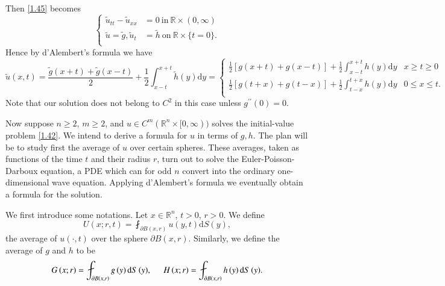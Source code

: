Then \eqref{1.45} becomes 
$$
\left\{ \begin{aligned}
	\widetilde{u}_{tt}-\widetilde{u}_{xx}&=0\ \text{in}\ \mathbb{R}\times(0,\infty)\\
	\widetilde{u}=\widetilde{g},\widetilde{u}_t&=\widetilde{h}\ \text{on}\ \mathbb{R}\times\{t=0\}.\\
\end{aligned} \right. 
$$
Hence by d'Alembert's formula we have 
\begin{equation}\label{1.97}
\widetilde{u}\left( x,t \right) =\frac{\widetilde{g}\left( x+t \right) +\widetilde{g}\left( x-t \right)}{2}+\frac{1}{2}\int_{x-t}^{x+t}{\widetilde{h}\left( y \right) \mathrm{d}y}=\left\{ \begin{aligned}
	\frac{1}{2}\left[ g\left( x+t \right) +g\left( x-t \right) \right] +\frac{1}{2}\int_{x-t}^{x+t}{h\left( y \right) \mathrm{d}y}&x\ge t\ge 0\\
	\frac{1}{2}\left[ g\left( t+x \right) +g\left( t-x \right) \right] +\frac{1}{2}\int_{t-x}^{t+x}{h\left( y \right) \mathrm{d}y}&0\le x\le t.\\
\end{aligned} \right. 
\end{equation}
Note that our solution does not belong to $C^2$ in this case unless $g^{\prime\prime}(0)=0$.\par
Now suppose $n\ge 2$, $m\ge 2$, and $u\in C^m(\mathbb{R}^n\times[0,\infty))$ solves the initial-value problem \eqref{1.42}. We intend to derive a formula for $u$ in terms of $g,h$. The plan will be to study first the average of $u$ over certain spheres. These averages, taken as functions of the time $t$ and their radius $r$, turn out to solve the Euler-Poisson-Darboux equation, a PDE which can for odd $n$ convert into the ordinary one-dimensional wave equation. Applying d'Alembert's formula we eventually obtain a formula for the solution.\par
We first introduce some notations. Let $x\in\mathbb{R}^n$, $t>0$, $r>0$. We define 
\begin{equation}\label{1.96}
U\left( x;r,t \right) =\fint_{\partial B\left( x,r \right)}{u\left( y,t \right) \mathrm{d}S\left( y \right)},
\end{equation}
the average of $u(\cdot,t)$ over the sphere $\partial B(x,r)$. Similarly, we define the average of $g$ and $h$ to be 
$$
G\left( x;r \right) =\fint_{\partial B\left( x,r \right)}{g\left( y \right) \mathrm{d}S\left( y \right)},\hspace{0.5cm}H\left( x;r \right) =\fint_{\partial B\left( x,r \right)}{h\left( y \right) \mathrm{d}S\left( y \right)}.
$$
